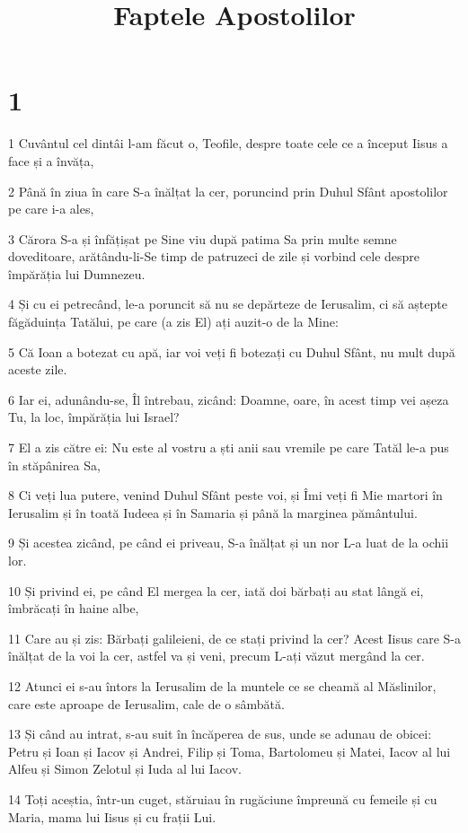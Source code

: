 

\title{Faptele Apostolilor}


\chapter{1}

\par 1 Cuvântul cel dintâi l-am făcut o, Teofile, despre toate cele ce a început Iisus a face și a învăța,
\par 2 Până în ziua în care S-a înălțat la cer, poruncind prin Duhul Sfânt apostolilor pe care i-a ales,
\par 3 Cărora S-a și înfățișat pe Sine viu după patima Sa prin multe semne doveditoare, arătându-li-Se timp de patruzeci de zile și vorbind cele despre împărăția lui Dumnezeu.
\par 4 Și cu ei petrecând, le-a poruncit să nu se depărteze de Ierusalim, ci să aștepte făgăduința Tatălui, pe care (a zis El) ați auzit-o de la Mine:
\par 5 Că Ioan a botezat cu apă, iar voi veți fi botezați cu Duhul Sfânt, nu mult după aceste zile.
\par 6 Iar ei, adunându-se, Îl întrebau, zicând: Doamne, oare, în acest timp vei așeza Tu, la loc, împărăția lui Israel?
\par 7 El a zis către ei: Nu este al vostru a ști anii sau vremile pe care Tatăl le-a pus în stăpânirea Sa,
\par 8 Ci veți lua putere, venind Duhul Sfânt peste voi, și Îmi veți fi Mie martori în Ierusalim și în toată Iudeea și în Samaria și până la marginea pământului.
\par 9 Și acestea zicând, pe când ei priveau, S-a înălțat și un nor L-a luat de la ochii lor.
\par 10 Și privind ei, pe când El mergea la cer, iată doi bărbați au stat lângă ei, îmbrăcați în haine albe,
\par 11 Care au și zis: Bărbați galileieni, de ce stați privind la cer? Acest Iisus care S-a înălțat de la voi la cer, astfel va și veni, precum L-ați văzut mergând la cer.
\par 12 Atunci ei s-au întors la Ierusalim de la muntele ce se cheamă al Măslinilor, care este aproape de Ierusalim, cale de o sâmbătă.
\par 13 Și când au intrat, s-au suit în încăperea de sus, unde se adunau de obicei: Petru și Ioan și Iacov și Andrei, Filip și Toma, Bartolomeu și Matei, Iacov al lui Alfeu și Simon Zelotul și Iuda al lui Iacov.
\par 14 Toți aceștia, într-un cuget, stăruiau în rugăciune împreună cu femeile și cu Maria, mama lui Iisus și cu frații Lui.
